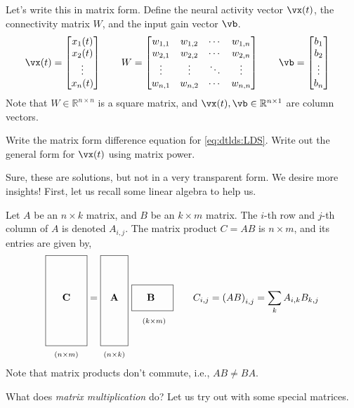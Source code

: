 \documentclass[a4paper,11pt]{exam}
\newcommand*{\clapp}[1]{\hbox to 0pt{\hss#1\hss}}
\newcommand*{\mat}[1]{\boldsymbol{\mathrm{#1}}}
\newcommand*{\subdims}[3]{\clapp{\raisebox{#1}[0pt][0pt]{$\scriptstyle(#2 \times #3)$}}}
\newcounter{ct}
\newcommand{\field}[1]{\ensuremath{\mathbb{#1}}}
\newcommand{\reals}{\field{R}}
\begin{document}
\begin{questions}
Let's write this in matrix form. Define the neural activity vector $\vx(t)$, the connectivity matrix $W$, and the input gain vector $\vb$.
\begin{align}
	\vx(t) &= 
	    \begin{bmatrix}
		x_1(t)\\
		x_2(t)\\
		\vdots\\
		x_n(t)
	    \end{bmatrix}
	\qquad
	W =
	    \begin{bmatrix}
		w_{1,1} & w_{1,2} & \cdots & w_{1,n}
		\\
		w_{2,1} & w_{2,2} & \cdots & w_{2,n}
		\\
		\vdots & \vdots & \ddots & \vdots
		\\
		w_{n,1} & w_{n,2} & \cdots & w_{n,n}
	    \end{bmatrix}
	\qquad
	\vb =
	    \begin{bmatrix}
		b_1\\
		b_2\\
		\vdots\\
		b_n
	    \end{bmatrix}
\end{align}
Note that $W \in \reals^{n \times n}$ is a square matrix, and $\vx(t), \vb \in \reals^{n \times 1}$ are column vectors.

\question Write the matrix form difference equation for \eqref{eq:dtlds:LDS}.
\question Write out the general form for $\vx(t)$ using matrix power.

Sure, these are solutions, but not in a very transparent form.
We desire more insights!
First, let us recall some linear algebra to help us.
\begin{tcolorbox}[colback=black!1!,title=Matrix multiplication]
Let $A$ be an $n \times k$ matrix, and $B$ be an $k \times m$ matrix.
The $i$-th row and $j$-th column of $A$ is denoted $A_{i,j}$.
The matrix product $C = AB$ is $n \times m$, and its entries are given by,
\begin{align}
    \framebox[1.5cm]{\clapp{\raisebox{0pt}[1.5cm][1.5cm]{$\mat C$}}\subdims{-2.0cm} n m} =
    \framebox[1.0cm]{\clapp{\raisebox{0pt}[1.5cm][1.5cm]{$\mat A$}}\subdims{-2.0cm} n k} \ 
    \framebox[1.5cm]{\clapp{\raisebox{0mm}[4.5mm][2.5mm]{$\mat B$}}       \subdims{-8mm} k m}
    \qquad
    C_{i,j} = \left(
    A
    B
    \right)_{i,j}
    =
    \sum_k A_{i,k} B_{k,j}
    \label{eq:matmult}
\end{align}
\\[3mm]
\noindent
Note that matrix products don't commute, i.e., $AB \neq BA$.
\end{tcolorbox}
\newpage
What does \emph{matrix multiplication} do?
Let us try out with some special matrices.


\end{questions}
\end{document}
